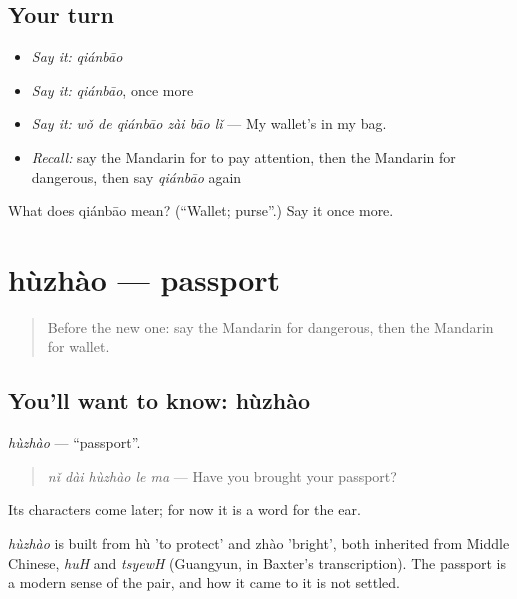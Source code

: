 \subsection*{Your turn}
\begin{itemize}
\raggedright
  \item \emph{Say it:} \emph{qiánbāo}
  \item \emph{Say it:} \emph{qiánbāo}, once more
  \item \emph{Say it:} \emph{wǒ de qiánbāo zài bāo lǐ} — My wallet's in my bag.
  \item \emph{Recall:} say the Mandarin for to pay attention, then the Mandarin for dangerous, then say \emph{qiánbāo} again
\end{itemize}

\begin{tcolorbox}[breakable,colback=teal!4,colframe=teal!35!black,title={Before you move on}]
What does qiánbāo mean? (\textquotedblleft{}Wallet; purse\textquotedblright{}.) Say it once more.
\end{tcolorbox}
\section[hùzhào]{hùzhào — passport}

\label{lesson:ZH-C116-huzhao}



\begin{quote}
Before the new one: say the Mandarin for dangerous, then the Mandarin for wallet.
\end{quote}

\subsection*{You'll want to know: hùzhào}
\emph{hùzhào} — \textquotedblleft{}passport\textquotedblright{}.

\begin{quote}
\emph{nǐ dài hùzhào le ma} — Have you brought your passport?
\end{quote}

Its characters come later; for now it is a word for the ear.

\begin{cousinweb}
\emph{hùzhào} is built from hù 'to protect' and zhào 'bright', both inherited from Middle Chinese, \emph{huH} and \emph{tsyewH} (Guangyun, in Baxter's transcription). The passport is a modern sense of the pair, and how it came to it is not settled.
\end{cousinweb}

